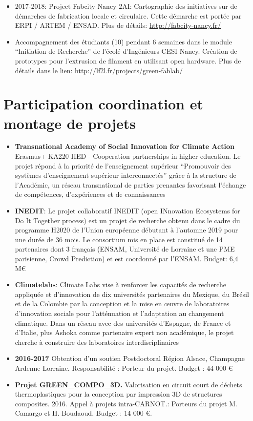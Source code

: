 \documentclass[
  12pt,
  oneside]{book}
\begin{document}
\begin{itemize}
\item
  2017-2018: Project Fabcity Nancy 2AI: Cartographie des initiatives sur de démarches de fabrication locale et circulaire. Cette démarche est portée par ERPI / ARTEM / ENSAD. Plus de détails: \url{http://fabcity-nancy.fr/}
\item
  Accompagnement des étudiants (10) pendant 6 semaines dans le module ``Initiation de Recherche'' de l'écolé d'Ingénieurs CESI Nancy.
  Création de prototypes pour l'extrusion de filament en utilisant open hardware.
  Plus de détails dans le lien: \url{http://lf2l.fr/projects/green-fablab/}
\end{itemize}

\hypertarget{participation-coordination-et-montage-de-projets}{%
\section{Participation coordination et montage de projets}\label{participation-coordination-et-montage-de-projets}}

\begin{itemize}
\item
  \textbf{Transnational Academy of Social Innovation for Climate Action} Erasmus+ KA220-HED - Cooperation partnerships in higher education. Le projet répond à la priorité de l'enseignement supérieur ``Promouvoir des systèmes d'enseignement supérieur interconnectés'' grâce à
  la structure de l'Académie, un réseau transnational de parties prenantes favorisant l'échange de compétences, d'expériences et de
  connaissances
\item
  \textbf{INEDIT}: Le projet collaboratif INEDIT (open INnovation Ecosystems for Do It Together process) est un projet de recherche obtenu dans le cadre du programme H2020 de l'Union européenne débutant à l'automne 2019 pour une durée de 36 mois. Le consortium mis en place est constitué de 14 partenaires dont 3 français (ENSAM, Université de Lorraine et une PME parisienne, Crowd Prediction) et est coordonné par l'ENSAM. Budget: 6,4 M€
\item
  \textbf{Climatelabs}: Climate Labs vise à renforcer les capacités de recherche appliquée et d'innovation de dix universités partenaires du Mexique, du Brésil et de la Colombie par la conception et la mise en œuvre de laboratoires d'innovation sociale pour l'atténuation et l'adaptation au changement climatique. Dans un réseau avec des universités d'Espagne, de France et d'Italie, plus Ashoka comme partenaire expert non académique, le projet cherche à construire des laboratoires interdisciplinaires
\item
  \textbf{2016-2017} Obtention d'un soutien Postdoctoral Région Alsace, Champagne Ardenne Lorraine. Responsabilité : Porteur du projet. Budget : 44 000 €
\item
  \textbf{Projet GREEN\_COMPO\_3D.} Valorisation en circuit court de déchets thermoplastiques pour la conception par impression 3D de structures composites. 2016. Appel à projets intra-CARNOT.: Porteurs du projet M. Camargo et H. Boudaoud.
  Budget : 14 000 €.
\end{itemize}
\end{document}

